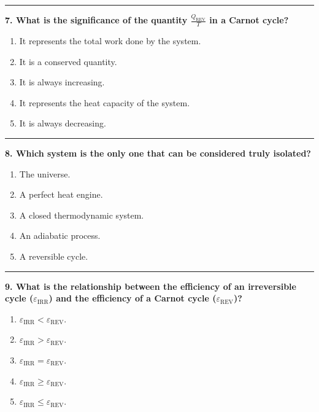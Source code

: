 \documentclass[
  9pt,
]{extbook}
\providecommand{\tightlist}{%
  \setlength{\itemsep}{0pt}\setlength{\parskip}{0pt}}
\theoremstyle{definition}
\theoremstyle{definition}
\theoremstyle{definition}
\theoremstyle{definition}
\theoremstyle{remark}
\begin{document}
\begin{center}\rule{0.5\linewidth}{0.5pt}\end{center}

\textbf{7. What is the significance of the quantity \(\frac{Q_{\text{REV}}}{T}\) in a Carnot cycle?}

\begin{enumerate}
\def\labelenumi{\alph{enumi}.}
\tightlist
\item
  It represents the total work done by the system.
\item
  It is a conserved quantity.
\item
  It is always increasing.
\item
  It represents the heat capacity of the system.
\item
  It is always decreasing.
\end{enumerate}

\begin{center}\rule{0.5\linewidth}{0.5pt}\end{center}

\textbf{8. Which system is the only one that can be considered truly isolated?}

\begin{enumerate}
\def\labelenumi{\alph{enumi}.}
\tightlist
\item
  The universe.
\item
  A perfect heat engine.
\item
  A closed thermodynamic system.
\item
  An adiabatic process.
\item
  A reversible cycle.
\end{enumerate}

\begin{center}\rule{0.5\linewidth}{0.5pt}\end{center}

\textbf{9. What is the relationship between the efficiency of an irreversible cycle (\(\varepsilon_{\text{IRR}}\)) and the efficiency of a Carnot cycle (\(\varepsilon_{\text{REV}}\))?}

\begin{enumerate}
\def\labelenumi{\alph{enumi}.}
\tightlist
\item
  \(\varepsilon_{\text{IRR}} < \varepsilon_{\text{REV}}\).
\item
  \(\varepsilon_{\text{IRR}} > \varepsilon_{\text{REV}}\).
\item
  \(\varepsilon_{\text{IRR}} = \varepsilon_{\text{REV}}\).
\item
  \(\varepsilon_{\text{IRR}} \geq \varepsilon_{\text{REV}}\).
\item
  \(\varepsilon_{\text{IRR}} \leq \varepsilon_{\text{REV}}\).
\end{enumerate}
\end{document}
